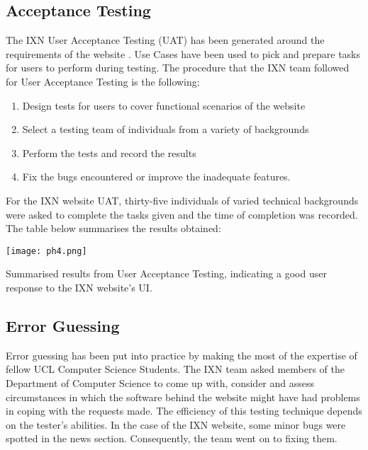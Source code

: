 \documentclass[fontsize=11pt]{extarticle}
\numberwithin{figure}{section} %
\numberwithin{table}{section}%
\providecommand{\tightlist}{%
  \setlength{\itemsep}{0pt}\setlength{\parskip}{0pt}}
\begin{document}
\hypertarget{acceptance-testing}{%
\subsection{Acceptance Testing}\label{acceptance-testing}}

The IXN User Acceptance Testing (UAT) has been generated around the
requirements of the website \cite{g7} . Use Cases have been used to pick
and prepare tasks for users to perform during testing. The procedure
that the IXN team followed for User Acceptance Testing is the following:

\begin{enumerate}

\tightlist
\item
  Design tests for users to cover functional scenarios of the website
\item
  Select a testing team of individuals from a variety of backgrounds
\item
  Perform the tests and record the results
\item
  Fix the bugs encountered or improve the inadequate features.
\end{enumerate}

For the IXN website UAT, thirty-five individuals of varied technical
backgrounds were asked to complete the tasks given and the time of
completion was recorded. The table below summarises the results
obtained:

\begin{table}[H]
      \centering
      \texttt{[image: ph4.png]}
      \caption{Summarised results from User Acceptance Testing, indicating a good user response to the IXN website's UI. }
 \end{table}

\hypertarget{error-guessing}{%
\subsection{Error Guessing}\label{error-guessing}}

Error guessing has been put into practice by making the most of the
expertise of fellow UCL Computer Science Students. The IXN team asked
members of the Department of Computer Science to come up with, consider
and assess circumstances in which the software behind the website might
have had problems in coping with the requests made. The efficiency of
this testing technique depends on the tester's abilities. In the case of
the IXN website, some minor bugs were spotted in the news section.
Consequently, the team went on to fixing them.
\end{document}

